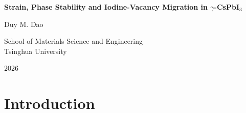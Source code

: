 \documentclass[12pt,a4paper,oneside]{report}
\begin{document}
\begin{titlepage}
  \centering
  \vspace*{3cm}
  {\LARGE\bfseries Strain, Phase Stability and Iodine-Vacancy Migration in $\gamma$-CsPbI$_3$\par}
  \vspace{2cm}
  {\large Duy M. Dao\par}
  \vspace{1cm}
  {School of Materials Science and Engineering\\ Tsinghua University\par}
  \vfill
  {\large 2026\par}
\end{titlepage}

\tableofcontents

\chapter{Introduction}







\end{document}
